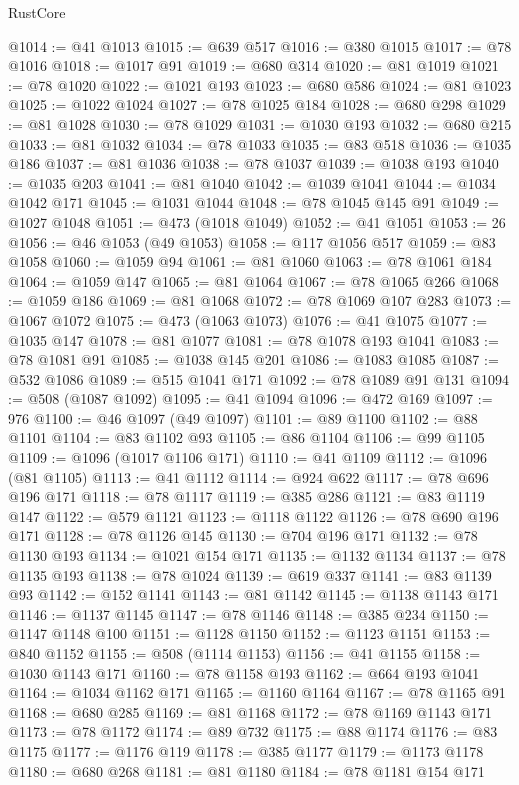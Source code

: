 \begin{lexlean}{RustCore}
\begin{coremodule}
@1014 := @41 @1013
@1015 := @639 @517
@1016 := @380 @1015
@1017 := @78 @1016
@1018 := @1017 @91
@1019 := @680 @314
@1020 := @81 @1019
@1021 := @78 @1020
@1022 := @1021 @193
@1023 := @680 @586
@1024 := @81 @1023
@1025 := @1022 @1024
@1027 := @78 @1025 @184
@1028 := @680 @298
@1029 := @81 @1028
@1030 := @78 @1029
@1031 := @1030 @193
@1032 := @680 @215
@1033 := @81 @1032
@1034 := @78 @1033
@1035 := @83 @518
@1036 := @1035 @186
@1037 := @81 @1036
@1038 := @78 @1037
@1039 := @1038 @193
@1040 := @1035 @203
@1041 := @81 @1040
@1042 := @1039 @1041
@1044 := @1034 @1042 @171
@1045 := @1031 @1044
@1048 := @78 @1045 @145 @91
@1049 := @1027 @1048
@1051 := @473 (@1018 @1049)
@1052 := @41 @1051
@1053 := 26
@1056 := @46 @1053 (@49 @1053)
@1058 := @117 @1056 @517
@1059 := @83 @1058
@1060 := @1059 @94
@1061 := @81 @1060
@1063 := @78 @1061 @184
@1064 := @1059 @147
@1065 := @81 @1064
@1067 := @78 @1065 @266
@1068 := @1059 @186
@1069 := @81 @1068
@1072 := @78 @1069 @107 @283
@1073 := @1067 @1072
@1075 := @473 (@1063 @1073)
@1076 := @41 @1075
@1077 := @1035 @147
@1078 := @81 @1077
@1081 := @78 @1078 @193 @1041
@1083 := @78 @1081 @91
@1085 := @1038 @145 @201
@1086 := @1083 @1085
@1087 := @532 @1086
@1089 := @515 @1041 @171
@1092 := @78 @1089 @91 @131
@1094 := @508 (@1087 @1092)
@1095 := @41 @1094
@1096 := @472 @169
@1097 := 976
@1100 := @46 @1097 (@49 @1097)
@1101 := @89 @1100
@1102 := @88 @1101
@1104 := @83 @1102 @93
@1105 := @86 @1104
@1106 := @99 @1105
@1109 := @1096 (@1017 @1106 @171)
@1110 := @41 @1109
@1112 := @1096 (@81 @1105)
@1113 := @41 @1112
@1114 := @924 @622
@1117 := @78 @696 @196 @171
@1118 := @78 @1117
@1119 := @385 @286
@1121 := @83 @1119 @147
@1122 := @579 @1121
@1123 := @1118 @1122
@1126 := @78 @690 @196 @171
@1128 := @78 @1126 @145
@1130 := @704 @196 @171
@1132 := @78 @1130 @193
@1134 := @1021 @154 @171
@1135 := @1132 @1134
@1137 := @78 @1135 @193
@1138 := @78 @1024
@1139 := @619 @337
@1141 := @83 @1139 @93
@1142 := @152 @1141
@1143 := @81 @1142
@1145 := @1138 @1143 @171
@1146 := @1137 @1145
@1147 := @78 @1146
@1148 := @385 @234
@1150 := @1147 @1148 @100
@1151 := @1128 @1150
@1152 := @1123 @1151
@1153 := @840 @1152
@1155 := @508 (@1114 @1153)
@1156 := @41 @1155
@1158 := @1030 @1143 @171
@1160 := @78 @1158 @193
@1162 := @664 @193 @1041
@1164 := @1034 @1162 @171
@1165 := @1160 @1164
@1167 := @78 @1165 @91
@1168 := @680 @285
@1169 := @81 @1168
@1172 := @78 @1169 @1143 @171
@1173 := @78 @1172
@1174 := @89 @732
@1175 := @88 @1174
@1176 := @83 @1175
@1177 := @1176 @119
@1178 := @385 @1177
@1179 := @1173 @1178
@1180 := @680 @268
@1181 := @81 @1180
@1184 := @78 @1181 @154 @171

\end{coremodule}
\end{lexlean}
